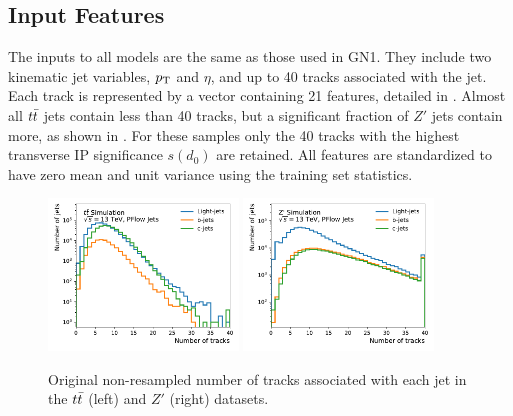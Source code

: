\subsection{Input Features}

The inputs to all models are the same as those used in GN1.
They include two kinematic jet variables, $p_{\text{T}}$ and $\eta$, and up to 40 tracks associated with the jet.
Each track is represented by a vector containing 21 features, detailed in .
Almost all $t\bar{t}$ jets contain less than 40 tracks, but a significant fraction of $Z'$ jets contain more, as shown in .
For these samples only the 40 tracks with the highest transverse IP significance $s(d_0)$ are retained.
All features are standardized to have zero mean and unit variance using the training set statistics.

\begin{figure}
    \centering
    \includegraphics[width=0.45\textwidth]{figures/flavour_tagging/ttbar_2.pdf}
    \includegraphics[width=0.45\textwidth]{figures/flavour_tagging/zprime_2.pdf}
    \caption{Original non-resampled number of tracks associated with each jet in the $t\bar{t}$ (left) and $Z'$ (right) datasets.}
    \label{fig:track_multiplicity}
\end{figure}

